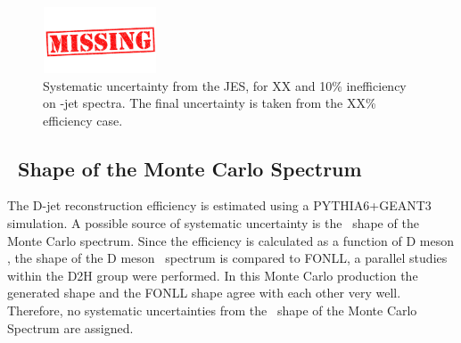 \begin{figure}[bth]
\centering
\includegraphics[width=0.3\textwidth]{missing}
\caption{Systematic uncertainty from the JES, for {\color{red}XX} and 10\% inefficiency on \Dzero-jet spectra. The final uncertainty is taken from the {\color{red}XX}\% efficiency case. }
\label{fig:JESsys_Dzero}
\end{figure}


\subsection{\pt\ Shape of the Monte Carlo Spectrum}

The D-jet reconstruction efficiency is estimated using a PYTHIA6+GEANT3 simulation.
A possible source of systematic uncertainty is the \ptd\ shape of the Monte Carlo spectrum.
Since the efficiency is calculated as a function of D meson , the shape of the D meson \ptd\ spectrum is compared to FONLL, a parallel studies within the D2H group were performed. In this Monte Carlo production the generated shape and the FONLL shape agree with each other very well. Therefore, no systematic uncertainties from the \ptd\ shape of the Monte Carlo Spectrum are assigned.


